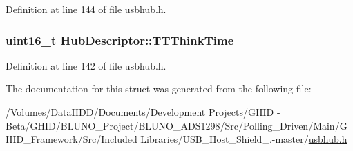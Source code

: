 \-Definition at line 144 of file usbhub.\-h.

\hypertarget{struct_hub_descriptor_a00002f5db3d923aa11645bfde3cd650e}{
\subsubsection[{\-T\-T\-Think\-Time}]{\setlength{\rightskip}{0pt plus 5cm}uint16\-\_\-t {\bf \-Hub\-Descriptor\-::\-T\-T\-Think\-Time}}}\label{struct_hub_descriptor_a00002f5db3d923aa11645bfde3cd650e}


\-Definition at line 142 of file usbhub.\-h.



\-The documentation for this struct was generated from the following file\-:\begin{DoxyCompactItemize}
\item 
/\-Volumes/\-Data\-H\-D\-D/\-Documents/\-Development Projects/\-G\-H\-I\-D -\/ Beta/\-G\-H\-I\-D/\-B\-L\-U\-N\-O\-\_\-\-Project/\-B\-L\-U\-N\-O\-\_\-\-A\-D\-S1298/\-Src/\-Polling\-\_\-\-Driven/\-Main/\-G\-H\-I\-D\-\_\-\-Framework/\-Src/\-Included Libraries/\-U\-S\-B\-\_\-\-Host\-\_\-\-Shield\-\_.-\/master/\hyperlink{usbhub_8h}{usbhub.\-h}\end{DoxyCompactItemize}
